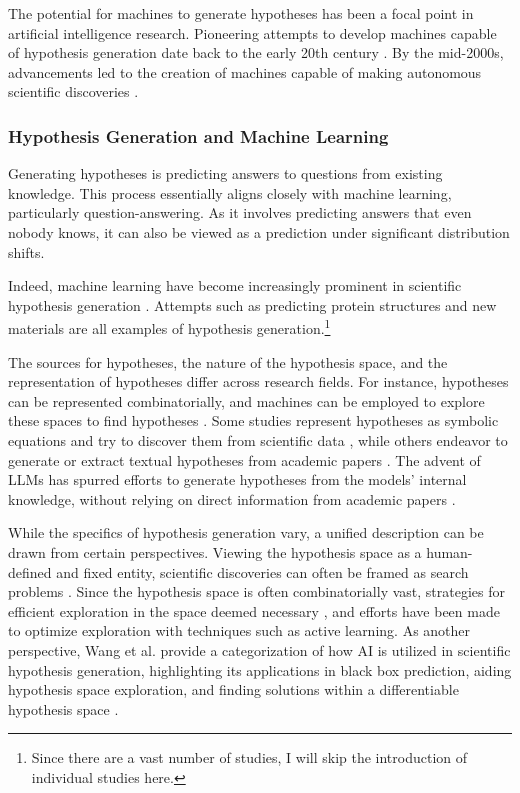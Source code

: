 \documentclass{article}
\begin{document}
The potential for machines to generate hypotheses has been a focal point in artificial intelligence research. Pioneering attempts to develop machines capable of hypothesis generation date back to the early 20th century \cite{langley1987scientific,lindsay1993dendral}. By the mid-2000s, advancements led to the creation of machines capable of making autonomous scientific discoveries \cite{king2004functional}.

\subsubsection{Hypothesis Generation and Machine Learning}
Generating hypotheses is predicting answers to questions from existing knowledge. This process essentially aligns closely with machine learning, particularly question-answering. As it involves predicting answers that even nobody knows, it can also be viewed as a prediction under significant distribution shifts.

Indeed, machine learning have become increasingly prominent in scientific hypothesis generation \cite{xu2021artificial,zhang2023artificial,wang2023scientific}. Attempts such as predicting protein structures \cite{jumper2021highly} and new materials \cite{merchant2023scaling} are all examples of hypothesis generation.\footnote{
Since there are a vast number of studies, I will skip the introduction of individual studies here.
}

The sources for hypotheses, the nature of the hypothesis space, and the representation of hypotheses differ across research fields. For instance, hypotheses can be represented combinatorially, and machines can be employed to explore these spaces to find hypotheses \cite{coley2020autonomous}. Some studies represent hypotheses as symbolic equations and try to discover them from scientific data \cite{kramer2023automated}, while others endeavor to generate or extract textual hypotheses from academic papers \cite{kang2022augmenting,chan2018solvent,wang2023learning,xu2023exploring,yang2023large}. The advent of LLMs has spurred efforts to generate hypotheses from the models' internal knowledge, without relying on direct information from academic papers \cite{park2023can,ai4science2023impact}.

While the specifics of hypothesis generation vary, a unified description can be drawn from certain perspectives. Viewing the hypothesis space as a human-defined and fixed entity, scientific discoveries can often be framed as search problems \cite{coley2020autonomous}. 
Since the hypothesis space is often combinatorially vast, strategies for efficient exploration in the space deemed necessary \cite{coley2020autonomousII,zenil2023future}, and efforts have been made to optimize exploration with techniques such as active learning. As another perspective, Wang et al. provide a categorization of how AI is utilized in scientific hypothesis generation, highlighting its applications in black box prediction, aiding hypothesis space exploration, and finding solutions within a differentiable hypothesis space \cite{wang2023scientific}.
\end{document}

